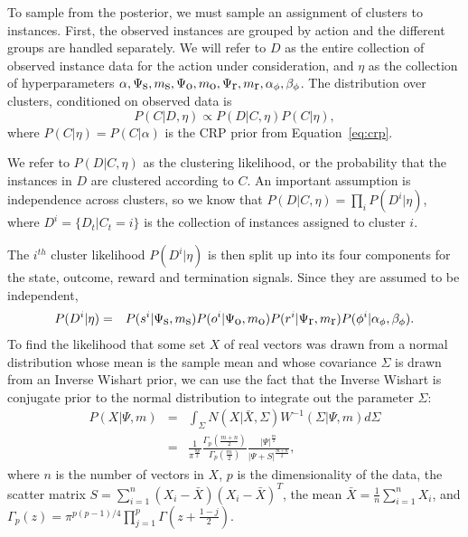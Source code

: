 To sample from the  posterior, we must sample an assignment of clusters to instances. First, the observed instances are grouped by action and the different groups are handled separately. We will refer to $D$ as the entire collection of observed instance data for the action under consideration, and $\eta$ as the collection of hyperparameters $\alpha, \Psi_{\mbox s}, m_{\mbox s},\Psi_{\mbox o}, m_{\mbox o},\Psi_{\mbox r}, m_{\mbox r},\alpha_\phi,\beta_\phi$. The distribution over clusters, conditioned on observed data is
$$P(C|D, \eta) \propto P(D|C, \eta)P(C|\eta),$$
where $P(C|\eta)=P(C|\alpha)$ is the CRP prior from Equation~\ref{eq:crp}.

We refer to $P(D|C, \eta)$ as the clustering likelihood, or the probability that the instances in $D$ are clustered according to $C$. An important assumption is independence across clusters, so we know that $P(D|C,\eta) = \prod_i P(D^i|\eta)$, where $D^i=\{D_t|C_t=i\}$ is the collection of instances assigned to cluster $i$.

The $i^{th}$ cluster likelihood $P(D^i|\eta)$ is then split up into its four components for the state, outcome, reward and termination signals. Since they are assumed to be independent, 
\begin{eqnarray*}
P(D^i|\eta)&=&P(s^i|\Psi_{\mbox s},m_{\mbox s})P(o^i|\Psi_{\mbox o},m_{\mbox o})P(r^i|\Psi_{\mbox r},m_{\mbox r})P(\phi^i|\alpha_\phi,\beta_\phi).
\end{eqnarray*}
To find the likelihood that some set $X$ of real vectors was drawn from a normal distribution whose mean is the sample mean and whose covariance $\Sigma$ is drawn from an Inverse Wishart prior, we can use the fact that the Inverse Wishart is conjugate prior to the normal distribution to integrate out the parameter $\Sigma$:
\begin{eqnarray}
\nonumber P(X|\Psi,m)&=&\int_\Sigma N(X|\bar X,\Sigma)W^{-1}(\Sigma|\Psi,m)d\Sigma\\
&=&\frac{1}{\pi^{\frac{np}{2}}}
\frac{\Gamma_p\left(\frac{m+n}{2}\right)}{\Gamma_p(\frac{m}{2})}
\frac{|\Psi|^{\frac{m}{2}}}{|\Psi+S|^{\frac{m+n}{2}}},\label{eq:iw}
\end{eqnarray}
where $n$ is the number of vectors in $X$, $p$ is the dimensionality of the data, the scatter matrix $S=\sum_{i=1}^n(X_i-\bar X)(X_i-\bar X)^T$, the mean $\bar X=\frac 1 n \sum_{i=1}^n X_i$, and $\Gamma_p(z)=\pi^{p(p-1)/4}\prod_{j=1}^p\Gamma\left(z+\frac {1-j} 2\right)$.

